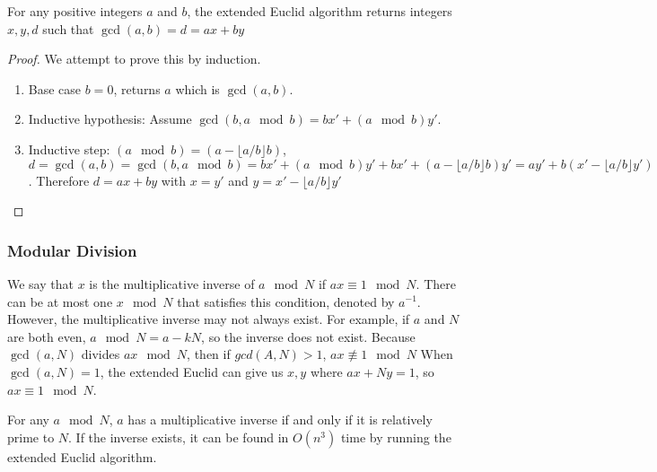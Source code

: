 \begin{lemma}
  For any positive integers $a$ and $b$, the extended Euclid algorithm returns integers $x, y, d$ such that $\gcd(a, b) = d = ax + by$
\end{lemma}
\begin{proof}
We attempt to prove this by induction.
\begin{enumerate}
  \item Base case $b = 0$, returns $a$ which is $\gcd(a, b)$.
	\item Inductive hypothesis: Assume $\gcd(b, a \mod b) = bx' + (a \mod b) y'$.
  \item Inductive step: $(a \mod b) = (a - \lfloor a/b \rfloor b)$, $d = \gcd(a, b) = \gcd(b, a \mod b) = bx' + (a \mod b) y' + bx' + (a - \lfloor a/b \rfloor b) y' = ay' + b(x' - \lfloor a/b \rfloor y')$. Therefore $d = ax + by$ with $x = y'$ and $y = x' - \lfloor a/b \rfloor y'$
\end{enumerate}
\end{proof}

\subsubsection{Modular Division}
We say that $x$ is the multiplicative inverse of $a \mod N$ if $ax \equiv 1 \mod N$.
There can be at most one $x \mod N$ that satisfies this condition, denoted by $a^{-1}$.
However, the multiplicative inverse may not always exist. For example, if $a$ and $N$ are both even, $a \mod N = a - kN$, so the inverse does not exist.
Because $\gcd(a, N)$ divides $ax \mod N$, then if $gcd(A, N) > 1$, $ax \not\equiv 1 \mod N$
When $\gcd(a, N) = 1$, the extended Euclid can give us $x, y$ where $ax + Ny = 1$, so $ax \equiv 1 \mod N$.
\begin{thm}
  For any $a \mod N$, $a$ has a multiplicative inverse if and only if it is relatively prime to $N$.
  If the inverse exists, it can be found in $O(n^3)$ time by running the extended Euclid algorithm.
\end{thm}

